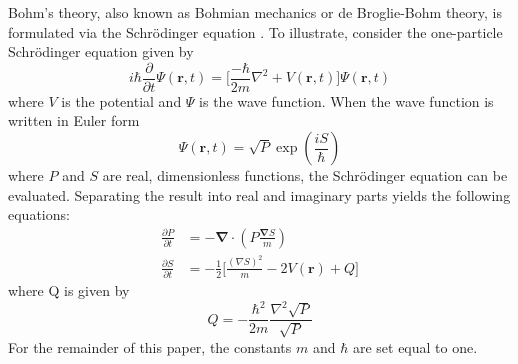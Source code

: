 \documentclass[10pt, reqno]{article}
\begin{document}
  Bohm's theory, also known as Bohmian mechanics or de Broglie-Bohm theory, is formulated via the Schrödinger equation \cite{bohm}.
  To illustrate, consider the one-particle Schrödinger equation given by 
    \begin{equation}
      i \hbar \frac{\partial}{\partial t} \Psi(\mathbf{r},t) = \Bigg[ \frac{-\hbar}{2m} \nabla^2 + V(\mathbf{r},t) \Bigg] \Psi(\mathbf{r},t)
    \end{equation}
  where $V$ is the potential and $\Psi$ is the wave function.
  When the wave function is written in Euler form 
    \begin{equation}
      \Psi(\mathbf{r},t) = \sqrt{P} \exp(\frac{iS}{\hbar}) 
    \end{equation}
  where $P$ and $S$ are real, dimensionless functions, the Schrödinger equation can be evaluated.
  Separating the result into real and imaginary parts yields the following equations:
  \begin{align} 
    \frac{\partial P}{\partial t} &= - \mathbf{\nabla} \cdot (P \frac{\mathbf{\nabla} S}{m}) \label{eq:bohm1} \\
    \frac{\partial S}{\partial t} &= - \frac{1}{2} \Bigg[ \frac{(\nabla S)^2}{m} - 2V(\mathbf{r}) + Q \label{eq:bohm2} \Bigg] 
  \end{align}
  where Q is given by
  \begin{equation} \label{eq:quantumpotential}
    Q = -\frac{\hbar^2}{2m}\frac{\nabla^2 \sqrt{P}}{\sqrt{P}}
  \end{equation}
  For the remainder of this paper, the constants $m$ and $\hbar$ are set equal to one.
    
\end{document}
